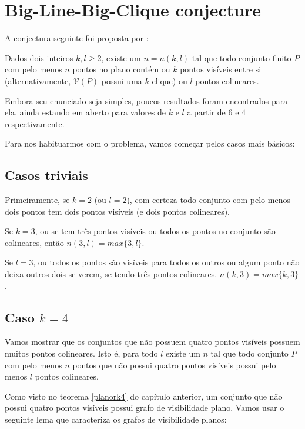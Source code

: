 \chapter{Big-Line-Big-Clique conjecture} A conjectura seguinte foi proposta por \cite{visibilitygraph}:
\begin{conjectura}\label{conj1}
    Dados dois inteiros $k,l\geq2$, existe um $n=n(k,l)$ tal que todo conjunto finito $P$ com pelo menos $n$ pontos no plano contém ou $k$ pontos visíveis entre si (alternativamente, $\mathcal V(P)$ possui uma $k$-clique) ou $l$ pontos colineares.
\end{conjectura}
Embora seu enunciado seja simples, poucos resultados foram encontrados para ela, ainda estando em aberto para valores de $k$ e $l$ a partir de $6$ e $4$ respectivamente.

Para nos habituarmos com o problema, vamos começar pelos casos mais básicos:

\section{Casos triviais}
Primeiramente, se $k=2$ (ou $l=2$), com certeza todo conjunto com pelo menos dois pontos tem dois pontos visíveis (e dois pontos colineares).

Se $k=3$, ou se tem três pontos visíveis ou todos os pontos no conjunto são colineares, então $n(3,l)=max\{3,l\}$.

Se $l=3$, ou todos os pontos são visíveis para todos os outros ou algum ponto não deixa outros dois se verem, se tendo três pontos colineares. $n(k,3) = max\{k,3\}$.


\section{Caso $k=4$}
Vamos mostrar que os conjuntos que não possuem quatro pontos visíveis possuem muitos pontos colineares. Isto é, para todo $l$ existe um $n$ tal que todo conjunto $P$ com pelo menos $n$ pontos que não possui quatro pontos visíveis possui pelo menos $l$ pontos colineares.

Como visto no teorema \ref{planork4} do capítulo anterior, um conjunto que não possui quatro pontos visíveis possui grafo de visibilidade plano. Vamos usar o seguinte lema que caracteriza os grafos de visibilidade planos:


